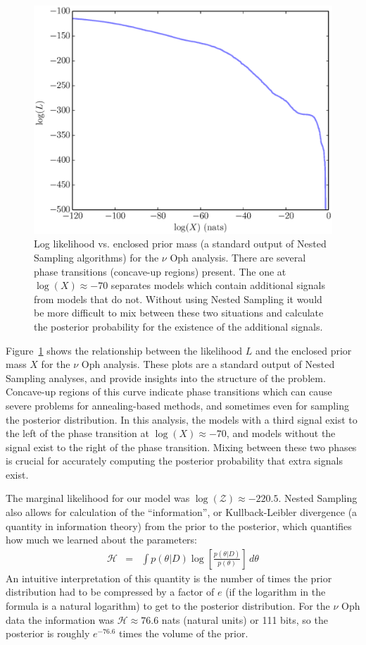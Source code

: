 \documentclass[useAMS,usenatbib]{mn2e}
\begin{document}
\begin{figure}
\includegraphics[scale=0.45]{Figures/logl0.eps}
\caption{Log likelihood vs. enclosed prior mass (a standard output of Nested
Sampling algorithms) for the $\nu$ Oph analysis.
There are several phase transitions (concave-up regions) present. The one at
$\log(X) \approx -70$ separates models which contain additional signals from
models that do not. Without using Nested Sampling it would be more difficult
to mix between these two situations and calculate the posterior probability
for the existence of the additional signals.
\label{fig:logl0}}
\end{figure}

Figure~\ref{fig:logl0} shows the relationship between the likelihood $L$
and the enclosed prior mass $X$ for the $\nu$ Oph analysis. These plots are
a standard output of Nested Sampling analyses, and provide
insights into the structure of the problem. Concave-up regions of this curve
indicate phase transitions which can cause severe problems for annealing-based
methods, and sometimes even for sampling the posterior distribution. In this
analysis, the models with a third signal exist to the left of the phase
transition at $\log(X) \approx -70$, and models without the signal exist to the
right of the phase transition. Mixing between these two phases is crucial for
accurately computing the posterior probability that extra signals exist.

The marginal likelihood for our model was
$\log(\mathcal{Z}) \approx -220.5$. Nested Sampling also allows for calculation
of the ``information'', or Kullback-Leibler divergence (a quantity in information
theory) from the prior to the posterior, which quantifies how much we learned about the parameters:
\begin{eqnarray}
\mathcal{H} &=& \int p(\theta | D) \log\left[\frac{p(\theta | D)}{p(\theta)}\right] \, d\theta
\end{eqnarray}
An intuitive interpretation of this quantity is the number of times the
prior distribution had to be compressed by a factor of $e$ (if the logarithm
in the formula is a natural logarithm) to get to the posterior distribution.
For the $\nu$ Oph data the information was $\mathcal{H} \approx 76.6$ nats
(natural units) or 111 bits, so the posterior is roughly $e^{-76.6}$ times the
volume of the prior.
\end{document}
